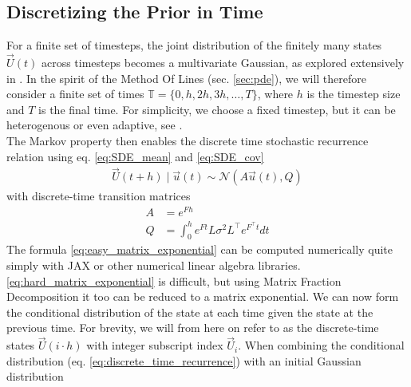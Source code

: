 \subsection*{Discretizing the Prior in Time}
For a finite set of timesteps, the joint distribution of the finitely many states $\vec{U}(t)$ across timesteps becomes a multivariate Gaussian, as explored extensively in \cite{gp_Rasmussen}. In the spirit of the Method Of Lines (sec. \ref{sec:pde}), we will therefore consider a finite set of times $\mathbb{T} = \{0, h, 2h, 3h, \dots, T\}$, where $h$ is the timestep size and $T$ is the final time. For simplicity, we choose a fixed timestep, but it can be heterogenous or even adaptive, see \cite{nicoThesis}. 
\\
The Markov property then enables the discrete time stochastic recurrence relation \cite{probnum} using eq. \ref{eq:SDE_mean} and \ref{eq:SDE_cov}
\begin{align}\label{eq:discrete_time_recurrence}
    \vec{U}(t+h) \;|\; \vec{u}(t) \sim \mathcal{N}(A\vec{u}(t), Q)
\end{align}
with discrete-time transition matrices
\begin{align}
    A &= e^{Fh}\label{eq:easy_matrix_exponential}
    \\
    Q &= \int_0^h e^{Ft}L\sigma^2L^\top e^{F^\top t} dt \label{eq:hard_matrix_exponential}
\end{align}
The formula \ref{eq:easy_matrix_exponential} can be computed numerically quite simply with JAX \cite{jax} or other numerical linear algebra libraries. \ref{eq:hard_matrix_exponential} is difficult, but using Matrix Fraction Decomposition it too can be reduced to a matrix exponential.
We can now form the conditional distribution of the state at each time given the state at the previous time. For brevity, we will from here on refer to as the discrete-time states $\vec{U}(i\cdot h)$ with integer subscript index $\vec{U}_i$. When combining the conditional distribution (eq. \ref{eq:discrete_time_recurrence}) with an initial Gaussian distribution 
